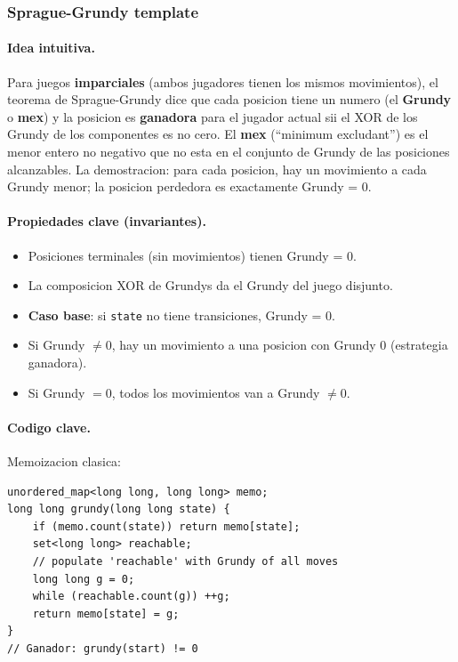 ﻿\subsubsection{Sprague-Grundy template}

\paragraph{Idea intuitiva.}
Para juegos \textbf{imparciales} (ambos jugadores tienen los mismos movimientos), el teorema de Sprague-Grundy dice que cada posicion tiene un numero (el \textbf{Grundy} o \textbf{mex}) y la posicion es \textbf{ganadora} para el jugador actual sii el XOR de los Grundy de los componentes es no cero. El \textbf{mex} (``minimum excludant'') es el menor entero no negativo que no esta en el conjunto de Grundy de las posiciones alcanzables. La demostracion: para cada posicion, hay un movimiento a cada Grundy menor; la posicion perdedora es exactamente Grundy = 0.

\paragraph{Propiedades clave (invariantes).}
\begin{itemize}\setlength\itemsep{0pt}
	\item Posiciones terminales (sin movimientos) tienen Grundy = 0.
	\item La composicion XOR de Grundys da el Grundy del juego disjunto.
	\item \textbf{Caso base}: si \texttt{state} no tiene transiciones, Grundy = 0.
	\item Si Grundy $\ne 0$, hay un movimiento a una posicion con Grundy $0$ (estrategia ganadora).
	\item Si Grundy $= 0$, todos los movimientos van a Grundy $\ne 0$.
\end{itemize}

\paragraph{Codigo clave.}
Memoizacion clasica:
\begin{verbatim}
unordered_map<long long, long long> memo;
long long grundy(long long state) {
    if (memo.count(state)) return memo[state];
    set<long long> reachable;
    // populate 'reachable' with Grundy of all moves
    long long g = 0;
    while (reachable.count(g)) ++g;
    return memo[state] = g;
}
// Ganador: grundy(start) != 0
\end{verbatim}

